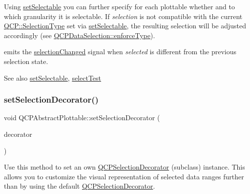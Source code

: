 Using \mbox{\hyperlink{class_q_c_p_abstract_plottable_ac238d6e910f976f1f30d41c2bca44ac3}{set\+Selectable}} you can further specify for each plottable whether and to which granularity it is selectable. If {\itshape selection} is not compatible with the current \mbox{\hyperlink{namespace_q_c_p_ac6cb9db26a564b27feda362a438db038}{Q\+C\+P\+::\+Selection\+Type}} set via \mbox{\hyperlink{class_q_c_p_abstract_plottable_ac238d6e910f976f1f30d41c2bca44ac3}{set\+Selectable}}, the resulting selection will be adjusted accordingly (see \mbox{\hyperlink{class_q_c_p_data_selection_a17b84d852911531d229f4a76aa239a75}{Q\+C\+P\+Data\+Selection\+::enforce\+Type}}).

emits the \mbox{\hyperlink{class_q_c_p_abstract_plottable_a3af66432b1dca93b28e00e78a8c7c1d9}{selection\+Changed}} signal when {\itshape selected} is different from the previous selection state.

\begin{DoxySeeAlso}{See also}
\mbox{\hyperlink{class_q_c_p_abstract_plottable_ac238d6e910f976f1f30d41c2bca44ac3}{set\+Selectable}}, \mbox{\hyperlink{class_q_c_p_abstract_plottable_addb3f5c41f007a78c3e142cc605bc712}{select\+Test}} 
\end{DoxySeeAlso}
\mbox{\label{class_q_c_p_abstract_plottable_a20e266ad646f8c4a7e4631040510e5d9}} 
\subsubsection{\texorpdfstring{setSelectionDecorator()}{setSelectionDecorator()}}
{\footnotesize\ttfamily void Q\+C\+P\+Abstract\+Plottable\+::set\+Selection\+Decorator (\begin{DoxyParamCaption}\item[{\mbox{\hyperlink{class_q_c_p_selection_decorator}{Q\+C\+P\+Selection\+Decorator}} $\ast$}]{decorator }\end{DoxyParamCaption})}

Use this method to set an own \mbox{\hyperlink{class_q_c_p_selection_decorator}{Q\+C\+P\+Selection\+Decorator}} (subclass) instance. This allows you to customize the visual representation of selected data ranges further than by using the default \mbox{\hyperlink{class_q_c_p_selection_decorator}{Q\+C\+P\+Selection\+Decorator}}.

